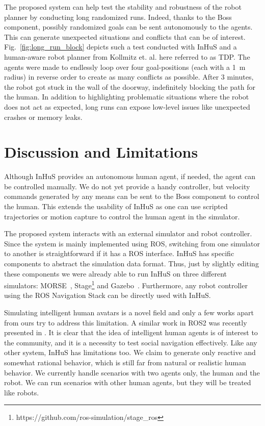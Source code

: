 The proposed system can help test the stability and robustness of the robot planner by conducting long randomized runs. Indeed, thanks to the Boss component, possibly randomized goals can be sent autonomously to the agents. This can generate unexpected situations and conflicts that can be of interest.
Fig.~\ref{fig:long_run_block} depicts such a test conducted with InHuS and a human-aware robot planner from Kollmitz et. al. \cite{kollmitz_time_2015} here referred to as TDP. The agents were made to endlessly loop over four goal-positions (each with a \SI{1}{\metre} radius) in reverse order to create as many conflicts as possible. After 3 minutes, the robot got stuck in the wall of the doorway, indefinitely blocking the path for the human. In addition to highlighting problematic situations where the robot does not act as expected, long runs can expose low-level issues like unexpected crashes or memory leaks.




\section{Discussion and Limitations}

Although InHuS provides an autonomous human agent, if needed, the agent can be controlled manually. We do not yet provide a handy controller, but velocity commands generated by any means can be sent to the Boss component to control the human. This extends the usability of InHuS as one can use scripted trajectories or motion capture to control the human agent in the simulator.

The proposed system interacts with an external simulator and robot controller. Since the system is mainly implemented using ROS, switching from one simulator to another is straightforward if it has a ROS interface. 
InHuS has specific components to abstract the simulation data format. Thus, just by slightly editing these components we were already able to run InHuS on three different simulators: MORSE~\cite{echeverria2011modular}, Stage\footnote{https://github.com/ros-simulation/stage\_ros} and Gazebo~\cite{koenig2004design}. Furthermore, any robot controller using the ROS Navigation Stack can be directly used with InHuS.

Simulating intelligent human avatars is a novel field and only a few works apart from ours try to address this limitation. A similar work in ROS2 was recently presented in \cite{perezhunavsim}.
It is clear that the idea of intelligent human agents is of interest to the community, and it is a necessity to test social navigation effectively. Like any other system, InHuS has limitations too. We claim to generate only reactive and somewhat rational behavior, which is still far from natural or realistic human behavior. We currently handle scenarios with two agents only, the human and the robot. We can run scenarios with other human agents, but they will be treated like robots.




